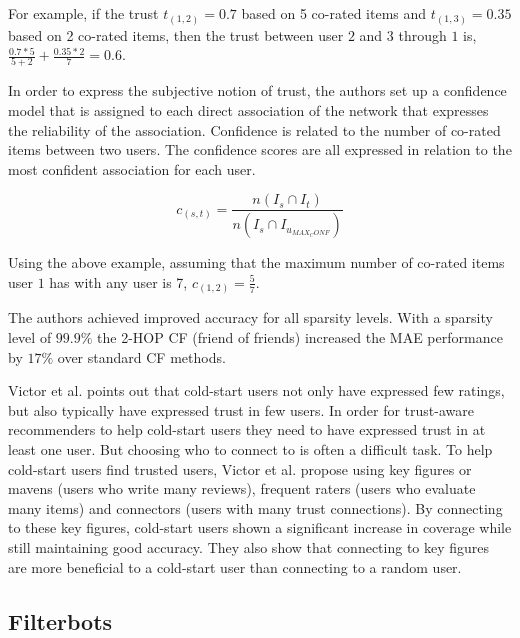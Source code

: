 For example, if the trust $t_{(1,2)} = 0.7$ based on 5 co-rated items
and $t_{(1,3)} = 0.35$ based on 2 co-rated items, then the trust
between user $2$ and $3$ through $1$ is, $\frac{0.7*5}{5+2} + \frac{0.35*2}{7} = 0.6$.

In order to express the subjective notion of trust, the authors set up a
confidence model that is assigned to each direct association of the network
that expresses the reliability of the association. Confidence is related to the
number of co-rated items between two users. The confidence scores are all
expressed in relation to the most confident association for each user.

\begin{equation}
c_{(s,t)} = \frac{n(I_{s} \cap I_{t})}{n(I_{s} \cap I_{u_{MAX_CONF}})}
\end{equation}

Using the above example, assuming that the maximum number of co-rated items
user $1$ has with any user is 7, $c_{(1,2)} = \frac{5}{7}$.

The authors achieved improved accuracy for all sparsity levels. With a sparsity
level of $99.9\%$ the 2-HOP CF (friend of friends) increased the MAE
performance by $17\%$ over standard CF methods.

Victor et al. \cite{Victor2008} points out that cold-start users not only have
expressed few ratings, but also typically have expressed trust in few users. In
order for trust-aware recommenders to help cold-start users they need to have
expressed trust in at least one user. But choosing who to connect to is often a
difficult task. To help cold-start users find trusted users, Victor et al.
propose using key figures or mavens (users who write many reviews), frequent
raters (users who evaluate many items) and connectors (users with
many trust connections). By connecting to these key figures, cold-start users
shown a significant increase in coverage while still maintaining good accuracy.
They also show that connecting to key figures are more beneficial to a
cold-start user than connecting to a random user.

\subsection{Filterbots}



